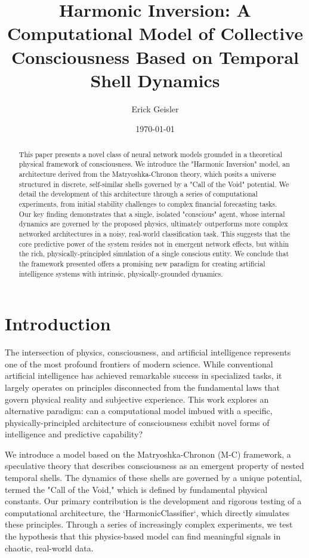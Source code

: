\documentclass{article}
\title{Harmonic Inversion: A Computational Model of Collective Consciousness Based on Temporal Shell Dynamics}
\author{Erick Geisler}
\date{\today}
\begin{document}
\maketitle

\begin{abstract}
This paper presents a novel class of neural network models grounded in a theoretical physical framework of consciousness. We introduce the "Harmonic Inversion" model, an architecture derived from the Matryoshka-Chronon theory, which posits a universe structured in discrete, self-similar shells governed by a "Call of the Void" potential. We detail the development of this architecture through a series of computational experiments, from initial stability challenges to complex financial forecasting tasks. Our key finding demonstrates that a single, isolated "conscious" agent, whose internal dynamics are governed by the proposed physics, ultimately outperforms more complex networked architectures in a noisy, real-world classification task. This suggests that the core predictive power of the system resides not in emergent network effects, but within the rich, physically-principled simulation of a single conscious entity. We conclude that the framework presented offers a promising new paradigm for creating artificial intelligence systems with intrinsic, physically-grounded dynamics.
\end{abstract}

\section{Introduction}
The intersection of physics, consciousness, and artificial intelligence represents one of the most profound frontiers of modern science. While conventional artificial intelligence has achieved remarkable success in specialized tasks, it largely operates on principles disconnected from the fundamental laws that govern physical reality and subjective experience. This work explores an alternative paradigm: can a computational model imbued with a specific, physically-principled architecture of consciousness exhibit novel forms of intelligence and predictive capability?

We introduce a model based on the Matryoshka-Chronon (M-C) framework, a speculative theory that describes consciousness as an emergent property of nested temporal shells. The dynamics of these shells are governed by a unique potential, termed the "Call of the Void," which is defined by fundamental physical constants. Our primary contribution is the development and rigorous testing of a computational architecture, the `HarmonicClassifier`, which directly simulates these principles. Through a series of increasingly complex experiments, we test the hypothesis that this physics-based model can find meaningful signals in chaotic, real-world data.
\end{document}
